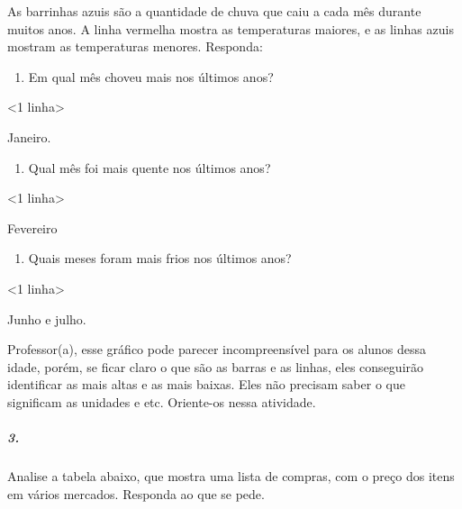 As barrinhas azuis são a quantidade de chuva que caiu a cada mês durante
muitos anos. A linha vermelha mostra as temperaturas maiores, e as
linhas azuis mostram as temperaturas menores. Responda:

\begin{enumerate}
\def\labelenumi{\alph{enumi})}
\item
  Em qual mês choveu mais nos últimos anos?
\end{enumerate}

\textless{}1 linha\textgreater{}

Janeiro.

\begin{enumerate}
\def\labelenumi{\alph{enumi})}
\item
  Qual mês foi mais quente nos últimos anos?
\end{enumerate}

\textless{}1 linha\textgreater{}

Fevereiro

\begin{enumerate}
\def\labelenumi{\alph{enumi})}
\item
  Quais meses foram mais frios nos últimos anos?
\end{enumerate}

\textless{}1 linha\textgreater{}

Junho e julho.

Professor(a), esse gráfico pode parecer incompreensível para os alunos
dessa idade, porém, se ficar claro o que são as barras e as linhas, eles
conseguirão identificar as mais altas e as mais baixas. Eles não
precisam saber o que significam as unidades e etc. Oriente-os nessa
atividade.

\subparagraph{3.}\label{section-80}

Analise a tabela abaixo, que mostra uma lista de compras, com o preço
dos itens em vários mercados. Responda ao que se pede.

